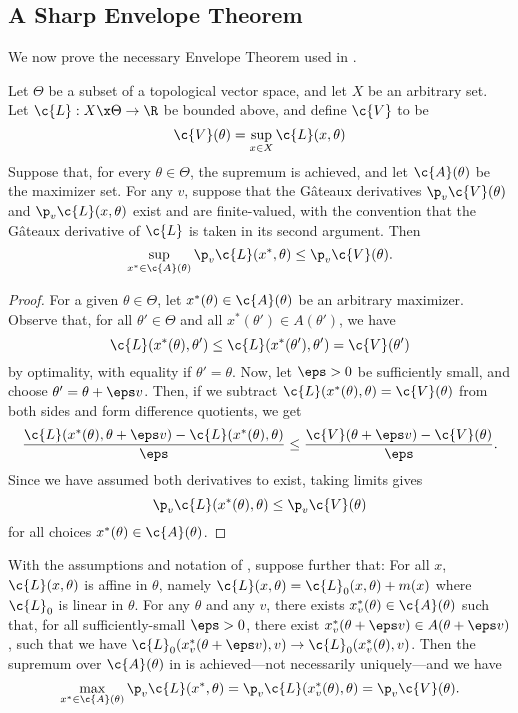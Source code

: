 \documentclass[preprint,12pt]{colt2025}
\begin{document}
\subsection{A Sharp Envelope Theorem}
\label{apdx:envelope}

We now prove the necessary Envelope Theorem used in .

\begin{lemma}
\label{lem:envelope}
Let $\Theta$ be a subset of a topological vector space, and let $X$ be an arbitrary set.
Let $\c{L} : X \x \Theta \to \R$ be bounded above, and define $\c{V}$ to be
\[
\c{V}(\theta) = \sup_{x\in X} \c{L}(x,\theta)
\]
Suppose that, for every $\theta\in\Theta$, the supremum is achieved, and let $\c{A}(\theta)$ be the maximizer set.
For any $v$, suppose that the Gâteaux derivatives $\p_v \c{V}(\theta)$ and $\p_v \c{L}(x,\theta)$ exist and are finite-valued, with the convention that the Gâteaux derivative of $\c{L}$ is taken in its second argument.
Then
\[
\sup_{x^*\in \c{A}(\theta)} \p_v \c{L}(x^*, \theta) \leq \p_v \c{V}(\theta)
.
\]
\end{lemma}

\begin{proof}
For a given $\theta\in\Theta$, let $x^*(\theta) \in \c{A}(\theta)$ be an arbitrary maximizer. 
Observe that, for all $\theta'\in\Theta$ and all $x^*(\theta')\in A(\theta')$, we have
\[
\c{L}(x^*(\theta),\theta') \leq \c{L}(x^*(\theta'),\theta') = \c{V}(\theta')
\]
by optimality, with equality if $\theta' = \theta$.
Now, let $\eps>0$ be sufficiently small, and choose $\theta' = \theta + \eps v$.
Then, if we subtract $\c{L}(x^*(\theta), \theta) = \c{V}(\theta)$ from both sides and form difference quotients, we get
\[
\frac{\c{L}(x^*(\theta),\theta + \eps v) - \c{L}(x^*(\theta), \theta)}{\eps} \leq \frac{\c{V}(\theta + \eps v) - \c{V}(\theta)}{\eps}
.
\]
Since we have assumed both derivatives to exist, taking limits gives
\[
\p_v \c{L}(x^*(\theta),\theta) \leq \p_v \c{V}(\theta)
\]
for all choices $x^*(\theta)\in \c{A}(\theta)$.
\end{proof}


\begin{lemma}
\label{lem:envelope_sharp}
With the assumptions and notation of , suppose further that:
\1 For all $x$, $\c{L}(x,\theta)$ is affine in $\theta$, namely $\c{L}(x,\theta) = \c{L}_0(x,\theta) + m(x)$ where $\c{L}_0$ is linear in $\theta$.
\2 For any $\theta$ and any $v$, there exists $x^*_v(\theta) \in \c{A}(\theta)$ such that, for all sufficiently-small $\eps>0$, there exist $x^*_v(\theta + \eps v) \in A(\theta + \eps v)$, such that we have $\c{L}_0(x^*_v(\theta+\eps v),v) \to \c{L}_0(x^*_v(\theta),v)$.
\0 
Then the supremum over $\c{A}(\theta)$ in  is achieved---not necessarily uniquely---and we have
\[
\max_{x^*\in \c{A}(\theta)} \p_v \c{L}(x^*, \theta) = \p_v \c{L}(x^*_v(\theta),\theta) = \p_v \c{V}(\theta)
.
\]
\end{lemma}
\end{document}
